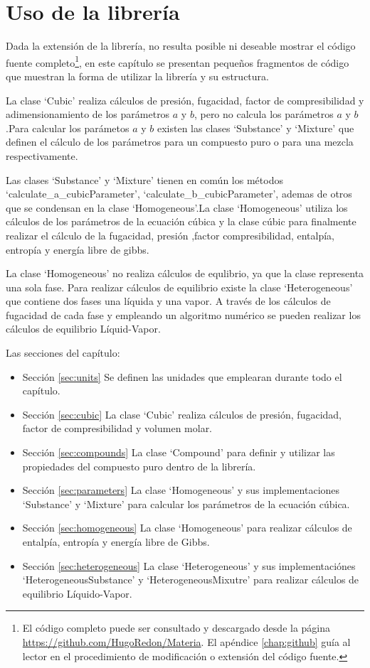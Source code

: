 \chapter{Uso de la librería}\label{chap:libraryUse}
	
	Dada la extensión de la librería, no resulta posible ni deseable mostrar el código fuente completo\footnote{El código completo puede ser consultado y descargado desde la página \url{https://github.com/HugoRedon/Materia}. El apéndice \ref{chap:github} guía al lector en el procedimiento de modificación o extensión del código fuente.}, en este capítulo se presentan pequeños fragmentos de código que muestran la forma de utilizar la librería y su estructura.
		
	La clase `Cubic' realiza cálculos de presión, fugacidad, factor de compresibilidad y adimensionamiento de los parámetros $a$ y $b$, pero no calcula los parámetros $a$ y $b$.Para calcular los parámetos $a$ y $b$ existen las clases `Substance' y `Mixture' que definen el cálculo de los parámetros para un compuesto puro o para una mezcla respectivamente. 

	Las clases `Substance' y `Mixture' tienen en común los métodos `calculate\_a\_cubicParameter', `calculate\_b\_cubicParameter', ademas de otros que se condensan en la clase `Homogeneous'.La clase `Homogeneous' utiliza los cálculos de los parámetros de la ecuación cúbica y la clase cúbic para finalmente realizar el cálculo de la fugacidad, presión ,factor compresibilidad, entalpía, entropía y energía libre de gibbs.

	La clase `Homogeneous' no realiza cálculos de equlibrio, ya que la clase representa una sola fase. Para realizar cálculos de equilibrio existe la clase `Heterogeneous' que contiene dos fases una líquida y una vapor. A través de los cálculos de fugacidad de cada fase y empleando un algoritmo numérico se pueden realizar los cálculos de equilibrio Líquid-Vapor.


	Las secciones del capítulo:
	\begin{itemize}
		\item{Sección} \ref{sec:units} Se definen las unidades que emplearan durante todo el capítulo.
		\item{Sección} \ref{sec:cubic}  La clase `Cubic' realiza cálculos de presión, fugacidad, factor de compresibilidad y volumen molar.
		\item{Sección} \ref{sec:compounds} La clase `Compound' para definir y utilizar las propiedades del compuesto puro dentro de la librería.
		\item {Sección} \ref{sec:parameters} La clase `Homogeneous' y sus implementaciones `Substance' y `Mixture' para calcular los parámetros de la ecuación cúbica.
		\item {Sección} \ref{sec:homogeneous} La clase `Homogeneous' para realizar cálculos de entalpía, entropía y energía libre de Gibbs.
		\item {Sección} \ref{sec:heterogeneous} La clase `Heterogeneous' y sus implementaciónes `HeterogeneousSubstance' y `HeterogeneousMixutre' para realizar cálculos de equilibrio Líquido-Vapor.
	\end{itemize}
